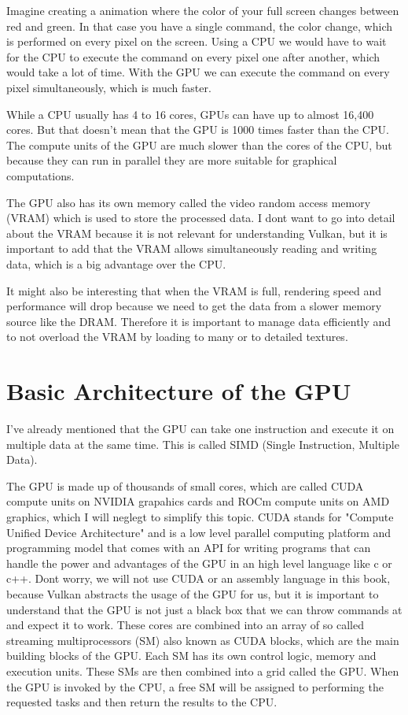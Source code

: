 \documentclass[12pt]{report} \usepackage{preamble}
\begin{document}
Imagine creating a animation where the color of your full screen changes
between red and green. In that case you have a single command, the color
change, which is performed on every pixel on the screen. Using a CPU
we would have to wait for the CPU to execute the command on every pixel
one after another, which would take a lot of time. With the GPU we can
execute the command on every pixel simultaneously, which is much faster.

While a CPU usually has 4 to 16 cores, GPUs can have up to almost 16,400
cores. \cite{NVIDIA-rtx-4090} But that doesn't mean that the GPU is 1000
times faster than the CPU. The compute units of the GPU are much slower
than the cores of the CPU, but because they can run in parallel they are
more suitable for graphical computations. \cite{CUDA_Programming_Guide}

The GPU also has its own memory called the video random access memory
(VRAM) which is used to store the processed data. I dont want to go into
detail about the VRAM because it is not relevant for understanding Vulkan,
but it is important to add that the VRAM allows simultaneously reading
and writing data, which is a big advantage over the CPU. \cite{vram}

It might also be interesting that when the VRAM is full, rendering
speed and performance will drop because we need to get the data from a
slower memory source like the DRAM.  Therefore it is important to manage
data efficiently and to not overload the VRAM by loading to many or to
detailed textures.

\section{Basic Architecture of the GPU}

I've already mentioned that the GPU can take one instruction and
execute it on multiple data at the same time. This is called SIMD
(Single Instruction, Multiple Data). \cite{cherry_gpu_architecture}

The GPU is made up of thousands of small cores, which are called CUDA
compute units on NVIDIA grapahics cards \cite{CUDA_Programming_Guide}
and ROCm compute units on AMD graphics, which I will neglegt to
simplify this topic. \cite{rocm} CUDA stands for "Compute Unified
Device Architecture" and is a low level parallel computing platform
and programming model that comes with an API for writing programs
that can handle the power and advantages of the GPU in an high level
language like c or c++. \cite{CUDA_Programming_Guide} Dont worry, we
will not use CUDA or an assembly language in this book, because Vulkan
abstracts the usage of the GPU for us, but it is important to understand
that the GPU is not just a black box that we can throw commands at and
expect it to work. These cores are combined into an array of so called
streaming multiprocessors (SM) also known as CUDA blocks, which are the
main building blocks of the GPU.  Each SM has its own control logic,
memory and execution units. \cite{CUDA_Programming_Guide} These SMs are
then combined into a grid called the GPU.  When the GPU is invoked by
the CPU, a free SM will be assigned to performing the requested tasks
and then return the results to the CPU. \cite{CUDA_Programming_Guide}
\end{document}

